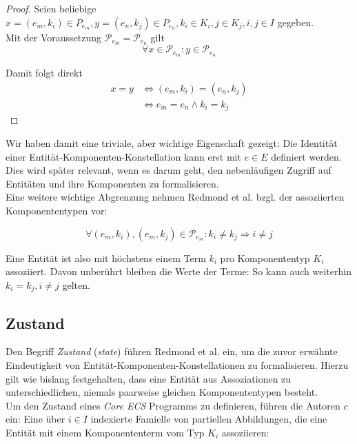 \begin{proof}
    Seien beliebige $x = (e_m, k_{i}) \in P_{e_m}, y = (e_n, k_j) \in P_{e_n}, k_i \in K_i, j \in K_j, i, j \in I$ gegeben.\\

    \noindent
    Mit der Voraussetzung $\mathcal{P}_{e_m} = \mathcal{P}_{e_n}$ gilt
    \[
        \forall x \in \mathcal{P}_{e_m} : y \in \mathcal{P}_{e_n}
    \]

    \noindent
    Damit folgt direkt
    \[
        \begin{alignat}{3}
            x = y &\Leftrightarrow (e_m, k_i) = (e_n, k_j) \\
                  &\Leftrightarrow e_m = e_n \land k_i = k_j
        \end{alignat}
    \]
\end{proof}
\bigskip

\noindent
Wir haben damit eine triviale, aber wichtige Eigenschaft gezeigt: Die Identität einer Entität-Komponenten-Konstellation kann erst mit $e \in E$ definiert werden.
Dies wird später relevant, wenn es darum geht, den nebenläufigen Zugriff auf Entitäten und ihre Komponenten zu formalisieren.\\

Eine weitere wichtige Abgrenzung nehmen Redmond et al. bzgl. der assoziierten Komponententypen vor:

\[
    \forall (e_m, k_i), (e_m, k_j) \in \mathcal{P}_{e_m} : k_i \neq k_j \Rightarrow i \neq j
\]

\noindent
Eine Entität ist also mit höchstens einem Term $k_i$ pro Komponententyp $K_i$ assoziiert.
Davon unberührt bleiben die Werte der Terme: So kann auch weiterhin $k_i = k_j, i \neq j$ gelten.

\subsection{Zustand}
Den Begriff \textit{Zustand} (\textit{state}) führen Redmond et {al.} ein, um die zuvor erwähnte Eindeutigkeit von Entität-Komponenten-Konstellationen zu formalisieren.
Hierzu gilt wie bislang festgehalten, dass eine Entität aus Assoziationen zu unterschiedlichen, niemals paarweise gleichen Komponententypen besteht.\\

Um den Zustand eines \textit{Core ECS} Programms zu definieren, führen die Autoren $c$ ein: Eine über $i \in I$ indexierte Famielle von partiellen Abbildungen, die eine Entität mit einem Komponententerm vom Typ $K_i$ assoziieren:

